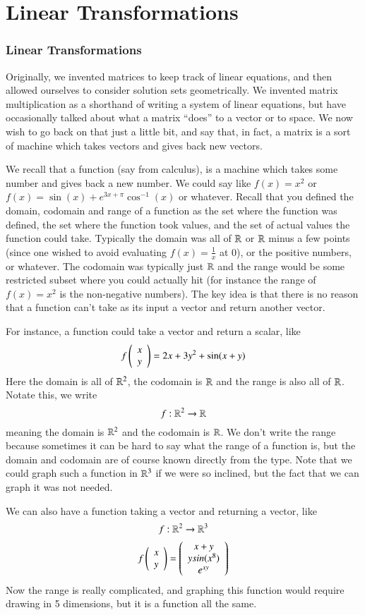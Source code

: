 \part{Linear Transformations}
\newpage

\section{Linear Transformations}
\label{sec:lineartransforms}

Originally, we invented matrices to keep track of linear equations, and then allowed ourselves to consider solution sets geometrically.
We invented matrix multiplication as a shorthand of writing a system of linear equations, but have occasionally talked about what a matrix ``does'' to a vector or to space.
We now wish to go back on that just a little bit, and say that, in fact, a matrix is a sort of machine which takes vectors and gives back new vectors.

We recall that a function (say from calculus), is a machine which takes some number and gives back a new number.
We could say like $f(x)=x^2$ or $f(x)=\sin(x) + e^{3x+\pi}\cos^{-1}(x)$ or whatever.
Recall that you defined the domain, codomain and range of a function as the set where the function was defined, the set where the function took values, and the set of actual values the function could take.  
Typically the domain was all of $\mathbb{R}$ or $\mathbb{R}$ minus a few points (since one wished to avoid evaluating $f(x)=\frac{1}{x}$ at 0), or the positive numbers, or whatever.
The codomain was typically just $\mathbb{R}$ and the range would be some restricted subset where you could actually hit (for instance the range of $f(x)=x^2$ is the non-negative numbers).
The key idea is that there is no reason that a function can't take as its input a vector and return another vector.

For instance, a function could take a vector and return a scalar, like
\[f\left(\begin{array}{c}x\\y\end{array}\right) = 2x + 3y^2 + \sin(x+y)\]
Here the domain is all of $\mathbb{R}^2$, the codomain is $\mathbb{R}$ and the range is also all of $\mathbb{R}$.
Notate this, we write
\[f:\mathbb{R}^2\to \mathbb{R}\]
meaning the domain is $\mathbb{R}^2$ and the codomain is $\mathbb{R}$.
We don't write the range because sometimes it can be hard to say what the range of a function is, but the domain and codomain are of course known directly from the type.
Note that we could graph such a function in $\mathbb{R}^3$ if we were so inclined, but the fact that we can graph it was not needed.  

We can also have a function taking a vector and returning a vector, like
\[f:\mathbb{R}^2\to \mathbb{R}^3\]
\[f\left(\begin{array}{c}x\\y\end{array}\right) =\left(\begin{array}{c}x+y\\ysin(x^8)\\e^{xy}\end{array}\right)\]
Now the range is really complicated, and graphing this function would require drawing in 5 dimensions, but it is a function all the same.

